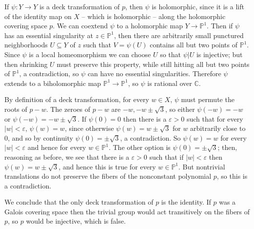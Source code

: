 \documentclass[10pt]{article}
\newcommand{\CC}{\mathbb{C}}
\newcommand{\PP}{\mathbb P}
\theoremstyle{definition}
\begin{document}
If $\psi: Y \to Y$ is a deck transformation of $p$, then $\psi$ is holomorphic, since it is a lift of the identity map on $X$ -- which is holomorphic -- along the holomorphic covering space $p$.
We can coextend $\psi$ to a holomorphic map $Y \to \PP^1$.
Then if $\psi$ has an essential singularity at $z \in \PP^1$, then there are arbitrarily small punctured neighborhoods $U \subseteq Y$ of $z$ such that $V = \psi(U)$ contains all but two points of $\PP^1$.
Since $\psi$ is a local homeomorphism we can choose $U$ so that $\psi|U$ is injective; but then shrinking $U$ must preserve this property, while still hitting all but two points of $\PP^1$, a contradiction, so $\psi$ can have no essential singularities.
Therefore $\psi$ extends to a biholomorphic map $\PP^1 \to \PP^1$, so $\psi$ is rational over $\CC$.

By definition of a deck transformation, for every $w \in X$, $\psi$ must permute the roots of $p - w$.
The zeroes of $p - w$ are $-w, -w \pm \sqrt 3$, so either $\psi(-w) = -w$ or $\psi(-w) = - w\pm \sqrt 3$.
If $\psi(0) = 0$ then there is a $\varepsilon > 0$ such that for every $|w| < \varepsilon$, $\psi(w) = w$, since otherwise $\psi(w) = w \pm \sqrt 3$ for $w$ arbitrarily close to $0$, and so by continuity $\psi(0) = \pm \sqrt 3$, a contradiction.
So $\psi(w) = w$ for every $|w| < \varepsilon$ and hence for every $w \in \PP^1$.
The other option is $\psi(0) = \pm \sqrt 3$; then, reasoning as before, we see that there is a $\varepsilon > 0$ such that if $|w| < \varepsilon$ then $\psi(w) = w \pm \sqrt 3$, and hence this is true for every $w \in \PP^1$.
But nontrivial translations do not preserve the fibers of the nonconstant polynomial $p$, so this is a contradiction.

We conclude that the only deck transformation of $p$ is the identity.
If $p$ was a Galois covering space then the trivial group would act transitively on the fibers of $p$, so $p$ would be injective, which is false.
\end{document}
